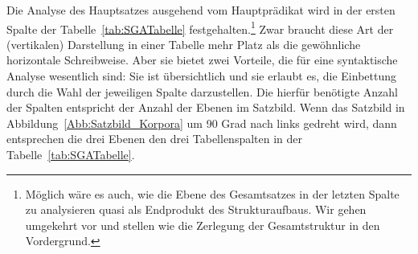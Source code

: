 Die Analyse des Hauptsatzes ausgehend vom Hauptprädikat wird in der ersten Spalte der Tabelle~\ref{tab:SGATabelle} festgehalten.\footnote{Möglich wäre es auch, wie \citet{Welke2007} die Ebene des Gesamtsatzes in der letzten Spalte zu analysieren quasi als Endprodukt des Strukturaufbaus. Wir gehen umgekehrt vor und stellen wie \citet[80--81]{Musan2021_SGA} die Zerlegung der Gesamtstruktur in den Vordergrund.} Zwar braucht diese Art der (vertikalen) Darstellung in einer Tabelle mehr Platz als die gewöhnliche horizontale Schreibweise. Aber sie bietet zwei Vorteile, die für eine syntaktische Analyse wesentlich sind: Sie ist übersichtlich und sie erlaubt es, die Einbettung durch die Wahl der jeweiligen Spalte darzustellen. Die hierfür benötigte Anzahl der Spalten entspricht der Anzahl der Ebenen im Satzbild. Wenn das Satzbild in Abbildung~\ref{Abb:Satzbild_Korpora} um 90 Grad nach links gedreht wird, dann entsprechen die drei Ebenen den drei Tabellenspalten in der Tabelle~\ref{tab:SGATabelle}.  

